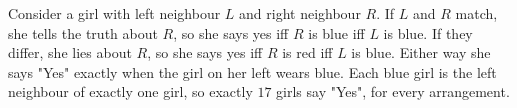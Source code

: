 Consider a girl with left neighbour $L$ and right neighbour $R$. If $L$ and $R$ match, she tells the truth about $R$, so she says yes iff $R$ is blue iff $L$ is blue. If they differ, she lies about $R$, so she says yes iff $R$ is red iff $L$ is blue. Either way she says "Yes" exactly when the girl on her left wears blue. Each blue girl is the left neighbour of exactly one girl, so exactly $\boxed{17}$ girls say "Yes", for every arrangement.
